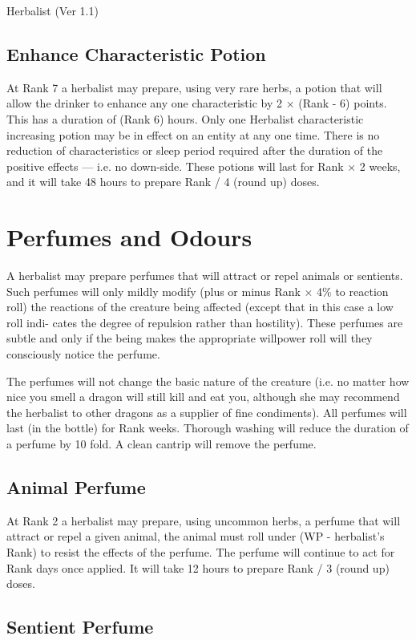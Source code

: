 \begin{Chapter}{Herbalist (Ver 1.1)}
\subsection{Enhance Characteristic Potion}

At Rank 7 a herbalist may prepare, using very rare herbs, a potion
that will allow the drinker to enhance any one characteristic by 2 ×
(Rank - 6) points. This has a duration of (Rank 6) hours. Only one
Herbalist characteristic increasing potion may be in effect on an
entity at any one time.  There is no reduction of characteristics or
sleep period required after the duration of the positive effects —
i.e. no down-side.  These potions will last for Rank × 2 weeks, and it
will take 48 hours to prepare Rank / 4 (round up) doses.

\section{Perfumes and Odours}

A herbalist may prepare perfumes that will attract or repel animals or
sentients.  Such perfumes will only mildly modify (plus or minus Rank
× 4\% to reaction roll) the reactions of the creature being affected
(except that in this case a low roll indi- cates the degree of
repulsion rather than hostility).  These perfumes are subtle and only
if the being makes the appropriate willpower roll will they
consciously notice the perfume.

The perfumes will not change the basic nature of the creature (i.e.
no matter how nice you smell a dragon will still kill and eat you,
although she may recommend the herbalist to other dragons as a
supplier of fine condiments). All perfumes will last (in the bottle)
for Rank weeks.  Thorough washing will reduce the duration of a
perfume by 10 fold. A clean cantrip will remove the perfume.

\subsection{Animal Perfume}

At Rank 2 a herbalist may prepare, using uncommon herbs, a perfume
that will attract or repel a given animal, the animal must roll under
(WP - herbalist’s Rank) to resist the effects of the perfume.  The
perfume will continue to act for Rank days once applied.  It will take
12 hours to prepare Rank / 3 (round up) doses.

\subsection{Sentient Perfume}


\end{Chapter}
